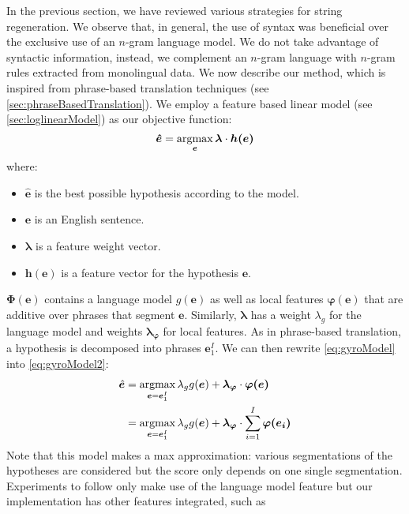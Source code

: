 In the previous section, we have reviewed various strategies for string
regeneration. We observe that, in general, the use of syntax was beneficial
over the exclusive use of an $n$-gram language model. We do not take advantage
of syntactic information, instead, we complement an $n$-gram language
with $n$-gram rules extracted from monolingual data. We now describe our method, which is inspired from
phrase-based translation techniques (see \autoref{sec:phraseBasedTranslation}).
We employ a feature based linear model (see \autoref{sec:loglinearModel}) as our
objective function:
%
\begin{equation}
  \bm{\hat{e}} = \operatorname*{argmax}_{\bm{e}} \bm{\lambda} \cdot \bm{h(e)}
  \label{eq:gyroModel}
\end{equation}
%
where:
%
\begin{itemize}
  \item $\bm{\hat{e}}$ is the best possible hypothesis according to the model.
  \item $\bm{e}$ is an English sentence.
  \item $\bm{\lambda}$ is a feature weight vector.
  \item $\bm{h(e)}$ is a feature vector for the hypothesis $\bm{e}$.
\end{itemize}
%
$\bm{\Phi}(\bm{e})$ contains a language model
$g(\bm{e})$ as well as local features $\bm{\varphi(e)}$
that are additive over phrases that segment $\bm{e}$.
Similarly, $\bm{\lambda}$ has a weight $\lambda_g$ for the language model
and weights $\bm{\lambda_{\varphi}}$ for local features. As in phrase-based
translation, a hypothesis
is decomposed into phrases $\bm{e}_1^I$. We can then rewrite
\autoref{eq:gyroModel} into \autoref{eq:gyroModel2}:
%
\begin{equation}
  \begin{split}
    \hat{\bm{e}} &= \operatorname*{argmax}_{\bm{e} = \bm{e}_1^I} \lambda_{g} g(\bm{e}) + \bm{\lambda_{\varphi}} \cdot \bm{\varphi(e)} \\
                 &= \operatorname*{argmax}_{\bm{e} = \bm{e}_1^I} \lambda_{g} g(\bm{e}) + \bm{\lambda_{\varphi}} \cdot \sum_{i = 1}^I \bm{\varphi(e_i)} \\
  \end{split}
  \label{eq:gyroModel2}
\end{equation}
%
Note that this model makes a max approximation: various segmentations of
the hypotheses are considered but the score only depends on one single
segmentation.
Experiments to follow only make use of the language model feature but
our implementation has other features integrated, such as
